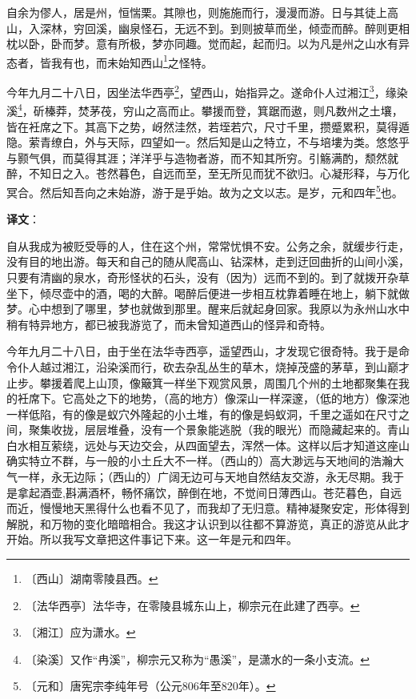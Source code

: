 \documentclass[12pt,UTF-8,openany,a4]{ctexbook}
\begin{document}
\begin{large}
    
    自余为僇人，居是州，恒惴栗。其隙也，则施施而行，漫漫而游。日与其徒上高山，入深林，穷回溪，幽泉怪石，无远不到。到则披草而坐，倾壶而醉。醉则更相枕以卧，卧而梦。意有所极，梦亦同趣。觉而起，起而归。以为凡是州之山水有异态者，皆我有也，而未始知西山\footnote{〔西山〕\yiwen 湖南零陵县西。}之怪特。
    
    今年九月二十八日，因坐法华西亭\footnote{〔法华西亭〕\yiwen 法华寺，在零陵县城东山上，柳宗元在此建了西亭。}，望西山，始指异之。遂命仆人过湘江\footnote{〔湘江〕\yiwen 应为潇水。}，缘染溪\footnote{〔染溪〕\yiwen 又作“冉溪”，柳宗元又称为“愚溪”，是潇水的一条小支流。}，斫榛莽，焚茅茷，穷山之高而止。攀援而登，箕踞而遨，则凡数州之土壤，皆在衽席之下。其高下之势，岈然洼然，若垤若穴，尺寸千里，攒蹙累积，莫得遁隐。萦青缭白，外与天际，四望如一。然后知是山之特立，不与培塿为类。悠悠乎与颢气俱，而莫得其涯；洋洋乎与造物者游，而不知其所穷。引觞满酌，颓然就醉，不知日之入。苍然暮色，自远而至，至无所见而犹不欲归。心凝形释，与万化冥合。然后知吾向之未始游，游于是乎始。故为之文以志。是岁，元和四年\footnote{〔元和〕\yiwen 唐宪宗李纯年号（公元806年至820年）。}也。

\end{large}


\newpage

\begin{Large}
   \noindent \textbf{译文}：
\end{Large}

\vspace{1em}

\begin{large}\yiwen
    
    自从我成为被贬受辱的人，住在这个州，常常忧惧不安。公务之余，就缓步行走，没有目的地出游。每天和自己的随从爬高山、钻深林，走到迂回曲折的山间小溪，只要有清幽的泉水，奇形怪状的石头，没有（因为）远而不到的。到了就拨开杂草坐下，倾尽壶中的酒，喝的大醉。喝醉后便进一步相互枕靠着睡在地上，躺下就做梦。心中想到了哪里，梦也就做到那里。醒来后就起身回家。我原以为永州山水中稍有特异地方，都已被我游览了，而未曾知道西山的怪异和奇特。
    
    今年九月二十八日，由于坐在法华寺西亭，遥望西山，才发现它很奇特。我于是命令仆人越过湘江，沿染溪而行，砍去杂乱丛生的草木，烧掉茂盛的茅草，到山巅才止步。攀援着爬上山顶，像簸箕一样坐下观赏风景，周围几个州的土地都聚集在我的衽席下。它高处之下的地势，（高的地方）像深山一样深邃，（低的地方）像深池一样低陷，有的像是蚁穴外隆起的小土堆，有的像是蚂蚁洞，千里之遥如在尺寸之间，聚集收拢，层层堆叠，没有一个景象能逃脱（我的眼光）而隐藏起来的。青山白水相互萦绕，远处与天边交会，从四面望去，浑然一体。这样以后才知道这座山确实特立不群，与一般的小土丘大不一样。（西山的）高大渺远与天地间的浩瀚大气一样，永无边际；（西山的）广阔无边可与天地自然结友交游，永无尽期。我于是拿起酒壶,斟满酒杯，畅怀痛饮，醉倒在地，不觉间日薄西山。苍茫暮色，自远而近，慢慢地天黑得什么也看不见了，而我却了无归意。精神凝聚安定，形体得到解脱，和万物的变化暗暗相合。我这才认识到以往都不算游览，真正的游览从此才开始。所以我写文章把这件事记下来。这一年是元和四年。
    

\end{large}
\end{document}
